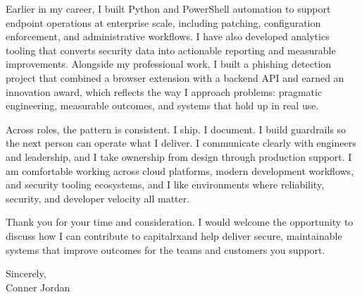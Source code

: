\documentclass[letterpaper,11pt]{article}
\newcommand{\companyname}{capitalrx}
\begin{document}
\vspace{16pt}

Earlier in my career, I built Python and PowerShell automation to support endpoint operations at enterprise scale, including patching, configuration enforcement, and administrative workflows. I have also developed analytics tooling that converts security data into actionable reporting and measurable improvements. Alongside my professional work, I built a phishing detection project that combined a browser extension with a backend API and earned an innovation award, which reflects the way I approach problems: pragmatic engineering, measurable outcomes, and systems that hold up in real use.

\vspace{16pt}

Across roles, the pattern is consistent. I ship. I document. I build guardrails so the next person can operate what I deliver. I communicate clearly with engineers and leadership, and I take ownership from design through production support. I am comfortable working across cloud platforms, modern development workflows, and security tooling ecosystems, and I like environments where reliability, security, and developer velocity all matter.

\vspace{16pt}

Thank you for your time and consideration. I would welcome the opportunity to discuss how I can contribute to \companyname and help deliver secure, maintainable systems that improve outcomes for the teams and customers you support.

\vspace{16pt}

Sincerely,\\
Conner Jordan
\end{document}
